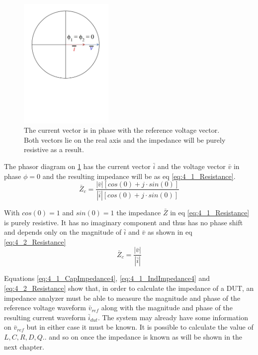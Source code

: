 \begin{figure}[H]
    \centering
    \includegraphics[clip, trim=0 275 0 0, width=0.4\textwidth]{Sections/4_TechnicalAnalysis/Figures/4_1_ResPhasor.pdf}
    \caption{The current vector is in phase with the reference voltage vector. Both vectors lie on the real axis and the impedance will be purely resistive as a result.}
    \label{fig:4_1_ResImpedance}
\end{figure}

The phasor diagram on \ref{fig:4_1_ResImpedance} has the current vector $\bar i$ and the voltage vector $\bar v$ in phase $\phi = 0$ and 
the resulting impedance will be as eq \ref{eq:4_1_Resistance}.
\begin{equation}\label{eq:4_1_Resistance}
    \bar Z_c = \frac{|\bar v| [cos(0) +j\cdot sin(0)]}{|\bar i| [cos(0) +j\cdot sin(0)]}
\end{equation}

With $cos(0) = 1$ and  $sin(0) = 1$ the impedance $\bar Z$ in eq \ref{eq:4_1_Resistance} is purely resistive. It has no imaginary component and thus has no phase shift and depends only on the magnitude of $\bar i$ and $\bar v$ as shown in eq \ref{eq:4_2_Resistance}
\begin{equation}\label{eq:4_2_Resistance}
    \bar Z_c = \frac{|\bar v|}{|\bar i|}
\end{equation}

Equations \ref{eq:4_1_CapImpedance4}, \ref{eq:4_1_IndImpedance4} and \ref{eq:4_2_Resistance} show that, in order to calculate the impedance of a DUT, an impedance analyzer must be able to measure the magnitude and phase of the reference voltage waveform $\bar v_{ref}$ along with the magnitude and phase of the resulting current waveform $\bar i_{dut}$. The system may already have some information on $\bar v_{ref}$ but in either case it must be known. It is possible to calculate the value of $L, C, R, D, Q..$ and so on once the impedance is known as will be shown in the next chapter.
